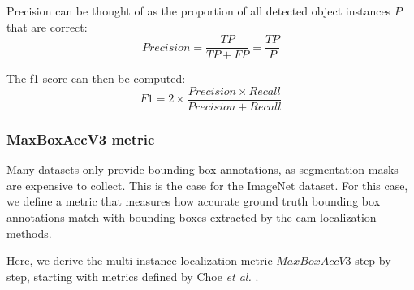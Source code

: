 Precision can be thought of as the proportion of all detected object instances $P$ that are correct:
\begin{equation} \label{eq:precision}
Precision = \frac{TP}{TP + FP} = \frac{TP}{P}
\end{equation}

The f1 score can then be computed:
\begin{equation} \label{eq:f1}
F1 = 2 \times \frac{Precision \times Recall}{Precision + Recall}
\end{equation}

\subsubsection{MaxBoxAccV3 metric} \label{sec:method_maxboxaccv3}
Many datasets only provide bounding box annotations, as segmentation masks are expensive to collect. This is the case for the ImageNet dataset. For this case, we define a metric that measures how accurate ground truth bounding box annotations match with bounding boxes extracted by the \acrshort{cam} localization methods.

Here, we derive the multi-instance localization metric $MaxBoxAccV3$ step by step, starting with metrics defined by Choe \textit{et al.} \cite{choe2020evaluating}.

